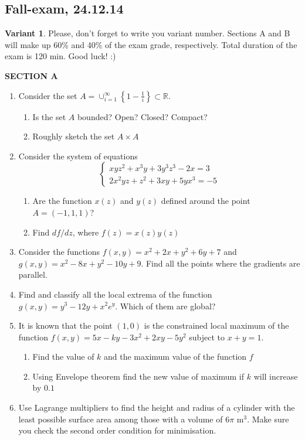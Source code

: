 \subsection{Fall-exam, 24.12.14}

\textbf{Variant 1}. Please, don't forget to write you variant number. Sections A and B will make up 60\% and 40\% of the exam grade, respectively. Total duration of the exam is 120 min. Good luck! :)

\vspace{10pt}

\textbf{SECTION A}


\begin{enumerate}
\item Consider the set $A=\cup_{i=1}^{\infty} \left\{ 1-\frac{1}{i} \right\} \subset \mathbb{R}$.
\begin{enumerate}
\item Is the set $A$ bounded? Open? Closed? Compact?
\item Roughly sketch the set $A \times A$
\end{enumerate}

\item Consider the system of equations
\[
\begin{cases}
xyz^2+x^3y+3y^3z^3-2x=3 \\
2x^2yz+z^2+3xy+5yx^3=-5
\end{cases}
\]
\begin{enumerate}
\item Are the function $x(z)$ and $y(z)$ defined around the point $A=(-1,1,1)$?
\item Find $df/dz$, where $f(z)=x(z)y(z)$
\end{enumerate}
\item Consider the functions $f(x,y)=x^2+2x+y^2+6y+7$ and $g(x,y)=x^2-8x+y^2-10y+9$. Find all the points where the gradients are parallel.
\item Find and classify all the local extrema of the function $g(x,y)=y^3 -12y+x^2e^y$. Which of them are global?
\item It is known that the point $(1,0)$ is the constrained local maximum of the function $f(x,y)=5x-ky-3x^2+2xy-5y^2$ subject to $x+y=1$.
\begin{enumerate}
\item Find the value of $k$ and the maximum value of the function $f$
\item Using Envelope theorem find the new value of maximum if $k$ will increase by $0.1$
\end{enumerate}
\item Use Lagrange multipliers to find the height and radius of a cylinder with the least possible
surface area among those with a volume of $6\pi$ m$^3$. Make sure you check the second order
condition for minimisation.
\end{enumerate}

